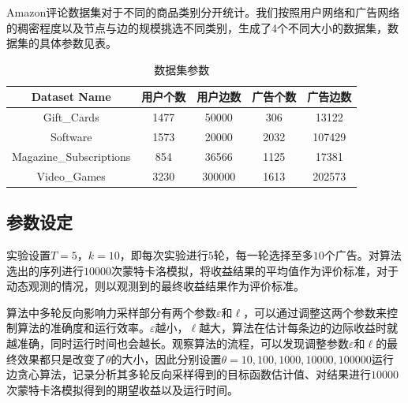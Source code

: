 Amazon评论数据集对于不同的商品类别分开统计。我们按照用户网络和广告网络的稠密程度以及节点与边的规模挑选不同类别，生成了4个不同大小的数据集，数据集的具体参数见表\label{tab:imdata}。

\begin{table}[htbp]
	\setlength{\tabcolsep}{2mm}{}
	\centering
	\normalsize
	\caption{数据集参数}\label{tab:imdata}
	\begin{tabular}[t]{|c|c|c|c|c|}
        \hline
		Dataset Name & 用户个数 & 用户边数 & 广告个数 & 广告边数 \\ \hline
		Gift\_Cards & 1477 & 50000 & 306 & 13122 \\ \hline
		Software & 1573 & 20000 & 2032 & 107429 \\ \hline
		Magazine\_Subscriptions & 854 & 36566 & 1125 & 17381 \\ \hline
		Video\_Games & 3230 & 300000 & 1613 & 202573 \\ \hline
	\end{tabular}	
\end{table}

\subsection{参数设定}

实验设置$T=5$，$k=10$，即每次实验进行$5$轮，每一轮选择至多$10$个广告。对算法选出的序列进行$10000$次蒙特卡洛模拟，将收益结果的平均值作为评价标准，对于动态观测的情况，则以观测到的最终收益结果作为评价标准。

算法中多轮反向影响力采样部分有两个参数$\varepsilon$和$\ell$，可以通过调整这两个参数来控制算法的准确度和运行效率。$\varepsilon$越小，$\ell$越大，算法在估计每条边的边际收益时就越准确，同时运行时间也会越长。观察算法的流程，可以发现调整参数$\varepsilon$和$\ell$的最终效果都只是改变了$\theta$的大小，因此分别设置$\theta=10,100,1000,10000,100000$运行边贪心算法，记录分析其多轮反向采样得到的目标函数估计值、对结果进行$10000$次蒙特卡洛模拟得到的期望收益以及运行时间。

